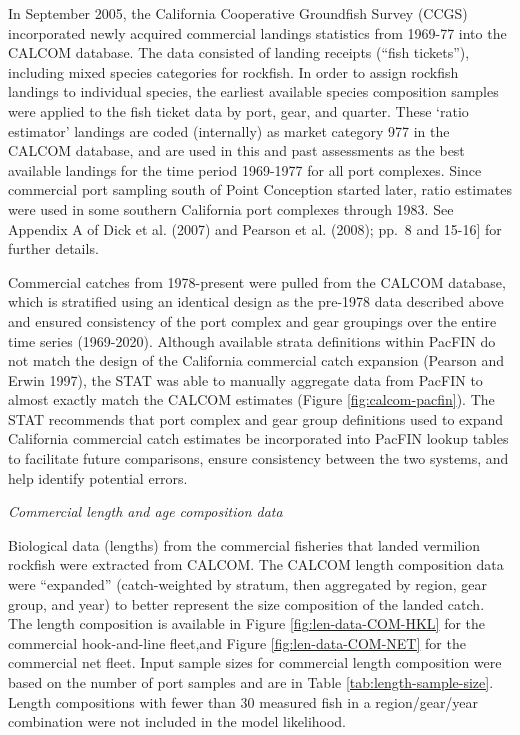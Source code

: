 \documentclass[11pt,
  english,
  a4paper,
]{article}
\begin{document}
In September 2005, the California Cooperative Groundfish Survey (CCGS) incorporated newly acquired commercial landings statistics from 1969-77 into the CALCOM database. The data consisted of landing receipts (``fish tickets''), including mixed species categories for rockfish. In order to assign rockfish landings to individual species, the earliest available species composition samples were applied to the fish ticket data by port, gear, and quarter. These `ratio estimator' landings are coded (internally) as market category 977 in the CALCOM database, and are used in this and past assessments as the best available landings for the time period 1969-1977 for all port complexes. Since commercial port sampling south of Point Conception started later, ratio estimates were used in some southern California port complexes through 1983. See Appendix A of Dick et al. {(2007)\leavevmode\tagmcend\tagstructend} and Pearson et al. {(2008)\leavevmode\tagmcend\tagstructend}; pp.~8 and 15-16{]} for further details.

Commercial catches from 1978-present were pulled from the CALCOM database, which is stratified using an identical design as the pre-1978 data described above and ensured consistency of the port complex and gear groupings over the entire time series (1969-2020). Although available strata definitions within PacFIN do not match the design of the California commercial catch expansion {(Pearson and Erwin 1997)\leavevmode\tagmcend\tagstructend}, the STAT was able to manually aggregate data from PacFIN to almost exactly match the CALCOM estimates (Figure \ref{fig:calcom-pacfin}). The STAT recommends that port complex and gear group definitions used to expand California commercial catch estimates be incorporated into PacFIN lookup tables to facilitate future comparisons, ensure consistency between the two systems, and help identify potential errors.

\emph{Commercial length and age composition data}

Biological data (lengths) from the commercial fisheries that landed vermilion rockfish were extracted from CALCOM. The CALCOM length composition data were ``expanded'' (catch-weighted by stratum, then aggregated by region, gear group, and year) to better represent the size composition of the landed catch. The length composition is available in Figure \ref{fig:len-data-COM-HKL} for the commercial hook-and-line fleet,and Figure \ref{fig:len-data-COM-NET} for the commercial net fleet. Input sample sizes for commercial length composition were based on the number of port samples and are in Table \ref{tab:length-sample-size}. Length compositions with fewer than 30 measured fish in a region/gear/year combination were not included in the model likelihood.
\end{document}
